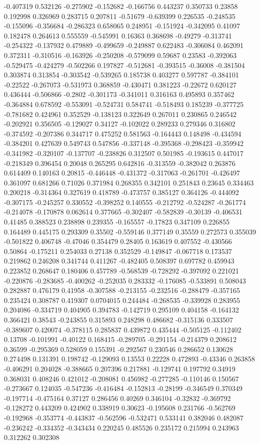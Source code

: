 -0.407319 0.532126 -0.275902 -0.152682 -0.166756 0.443237 0.350733 0.23858 0.192998 0.326969 0.283715 0.207811 -0.51679 -0.639399 0.226535 -0.248535 -0.155096 -0.356684 -0.286323 0.658065 0.248951 -0.151924 -0.342095 0.41097 0.182478 0.264613 0.555559 -0.545991 0.16363 0.368698 -0.49279 -0.313741 -0.254322 -0.137932 0.479889 -0.499659 -0.249887 0.622483 -0.306084 0.462091 0.372311 -0.310516 -0.163926 -0.250208 -0.579099 0.59687 0.23583 -0.392063 -0.529475 -0.424279 -0.502266 0.197827 -0.512681 -0.393515 -0.36008 -0.381504 0.303874 0.313854 -0.303542 -0.539265 0.185738 0.403277 0.597787 -0.384101 -0.22522 -0.267073 -0.531973 0.368859 -0.430471 0.381223 -0.22672 0.620127 0.436444 -0.506866 -0.2802 -0.301173 -0.341011 0.316163 0.495893 0.357462 -0.364884 0.678592 -0.553091 -0.524731 0.584741 -0.518493 0.185239 -0.377725 -0.781682 0.424961 0.352529 -0.138123 0.322649 0.267011 0.230865 0.246542 -0.202921 0.356505 -0.129027 0.34127 -0.102022 0.289233 0.279346 0.316802 -0.374592 -0.207386 0.344717 0.475252 0.581563 -0.164443 0.148498 -0.434594 -0.384201 0.427639 0.549743 0.547856 -0.337148 -0.395368 -0.298423 -0.359942 -0.341982 -0.320107 -0.137707 -0.238826 0.312507 0.501985 -0.193615 0.447017 -0.218349 0.396454 0.20048 0.265295 0.642816 -0.313559 -0.382042 0.263876 0.614409 0.140163 0.20815 -0.446448 -0.431372 -0.317063 -0.261701 -0.426497 0.361097 0.681266 0.71026 0.371984 0.268355 0.342101 0.251843 0.23645 0.334463 0.200218 -0.314364 0.327619 0.418789 -0.473757 0.385127 0.364126 -0.444092 -0.307175 -0.245257 0.330552 -0.398252 0.140555 -0.212792 -0.524287 -0.261774 -0.214078 -0.170878 0.062614 0.377665 -0.302407 -0.582839 -0.30139 -0.406531 0.41485 0.388523 0.238898 0.239355 -0.165557 -0.17823 0.347109 0.226855 0.164489 0.445175 0.293309 0.35502 -0.559146 0.377149 0.35559 0.272573 0.355039 -0.501822 0.406748 -0.47046 0.354479 0.28405 0.163619 0.407552 -0.430566 0.50864 -0.175211 0.254033 0.27138 0.352529 -0.149847 -0.067718 0.173537 0.219862 0.246208 0.341744 0.411267 -0.482405 0.508397 0.697782 0.459943 0.223852 0.268647 0.180406 0.457789 -0.568539 -0.728292 -0.397092 0.221021 -0.220876 -0.283685 -0.400262 -0.252035 0.283332 -0.176085 -0.533891 0.508043 0.282887 0.476179 0.41958 -0.307588 -0.213155 -0.232516 -0.288479 -0.357165 0.235424 0.308787 0.419307 0.0704015 0.244484 -0.268535 -0.339928 0.283955 0.204086 -0.334719 0.404905 0.394783 -0.142719 0.295109 0.404158 -0.164132 0.366421 0.38543 -0.243855 0.315893 0.248298 0.486682 -0.315136 0.333507 -0.389607 0.420074 -0.378115 0.285837 0.439872 0.435444 -0.505125 -0.112402 0.13708 -0.101991 -0.40122 0.168415 -0.289705 -0.291154 -0.214379 0.208612 0.36599 -0.295369 0.528059 0.155391 -0.292567 0.230546 0.286652 0.130628 0.274498 0.131391 0.198742 -0.129093 0.13553 0.22228 0.472893 -0.43346 0.263858 -0.406291 0.204028 -0.388665 0.207396 0.217881 -0.129741 0.197792 0.34919 0.368031 0.408246 0.421012 -0.208081 0.456982 -0.277285 -0.110146 0.150567 -0.273667 0.124035 -0.547236 -0.416484 -0.152813 -0.28199 -0.346549 0.370349 -0.197714 -0.475164 0.37127 0.286456 0.40269 0.346104 -0.32832 -0.369792 -0.128272 0.443209 0.424902 0.338919 0.30623 -0.195608 0.231766 -0.562769 -0.192968 -0.353774 -0.443837 -0.562596 -0.532471 0.533141 0.382046 0.482087 -0.236242 -0.334352 -0.343434 0.220245 0.485526 0.235172 0.215994 0.243963 0.312262 0.302308 